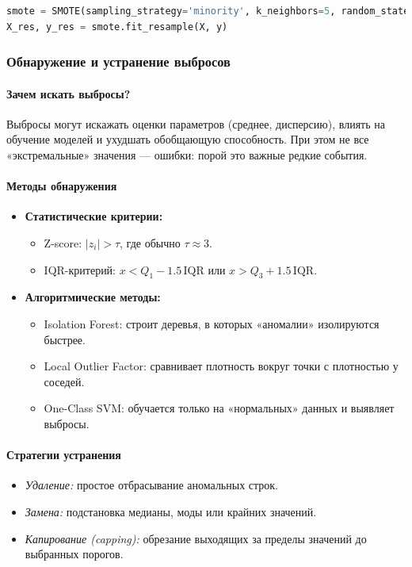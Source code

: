 \begin{center}
\begin{lstlisting}[language=Python]
smote = SMOTE(sampling_strategy='minority', k_neighbors=5, random_state=42)
X_res, y_res = smote.fit_resample(X, y)
\end{lstlisting}

\subsubsection{Обнаружение и устранение выбросов}
\label{sec:outliers}

\paragraph{Зачем искать выбросы?}  
Выбросы могут искажать оценки параметров (среднее, дисперсию), влиять на обучение моделей и ухудшать обобщающую способность. При этом не все «экстремальные» значения — ошибки: порой это важные редкие события.

\paragraph{Методы обнаружения}
\begin{itemize}
  \item \textbf{Статистические критерии:}
    \begin{itemize}
      \item Z-score: 
        $|z_i| > \tau$, где обычно $\tau\approx3$.
      \item IQR-критерий: 
        $x < Q_1 - 1.5\,\mathrm{IQR}$ или $x > Q_3 + 1.5\,\mathrm{IQR}$.
    \end{itemize}

  \item \textbf{Алгоритмические методы:}
    \begin{itemize}
      \item Isolation Forest: строит деревья, в которых «аномалии» изолируются быстрее.
      \item Local Outlier Factor: сравнивает плотность вокруг точки с плотностью у соседей.
      \item One-Class SVM: обучается только на «нормальных» данных и выявляет выбросы.
    \end{itemize}
\end{itemize}

\paragraph{Стратегии устранения}
\begin{itemize}
  \item \emph{Удаление:} простое отбрасывание аномальных строк.
  \item \emph{Замена:} подстановка медианы, моды или крайних значений.
  \item \emph{Капирование (capping):} обрезание выходящих за пределы значений до выбранных порогов.
\end{itemize}


\end{center}
